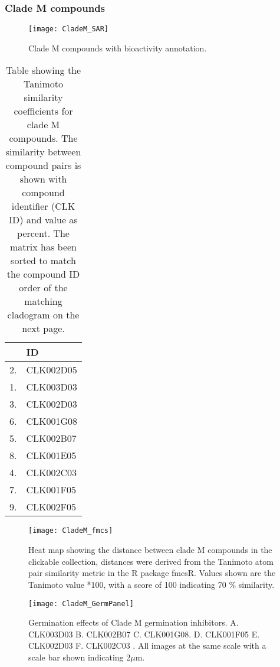 \subsubsection{Clade M compounds}

\begin{figure}
\texttt{[image: CladeM\_SAR]}
\caption{Clade M compounds with bioactivity annotation.}
\label{fig:CladeM_SAR}
\end{figure}

\begin{table}\centering
    \begin{tabular}{|l|l|}
    \hline
 & ID \\ \hline  
2. & CLK002D05  \\ \hline
1. & CLK003D03  \\ \hline
3. & CLK002D03  \\ \hline
6. & CLK001G08  \\ \hline
5. & CLK002B07  \\ \hline
8. & CLK001E05  \\ \hline
4. & CLK002C03  \\ \hline
7. & CLK001F05  \\ \hline
9. & CLK002F05  \\ \hline
    \end{tabular}
    \caption {Table showing the Tanimoto similarity coefficients for clade M compounds. The similarity between compound pairs is shown with compound identifier (CLK ID) and value as percent. The matrix has been sorted to match the compound ID order of the matching cladogram on the next page.}  
     \label{table:CladeM_fmcsVals}
\end{table}



\begin{figure}\centering
\texttt{[image: CladeM\_fmcs]}
\caption{Heat map showing the distance between clade M compounds in the clickable collection, distances were derived from the Tanimoto atom pair similarity metric in the R package fmcsR. Values shown are the Tanimoto value *100, with a score of 100 indicating 70 {\%} similarity.}
\label{fig:CladeM_fmcs}
\end{figure}


\begin{figure}
\centering
\texttt{[image: CladeM\_GermPanel]}
\caption{Germination effects of Clade M germination inhibitors. A. CLK003D03 B. CLK002B07 C. CLK001G08. D. CLK001F05 E. CLK002D03 F. CLK002C03 . All images at the same scale with a scale bar shown indicating 2$\mu$m.}
\label{fig:CladeM_GermPanel}
\end{figure}

